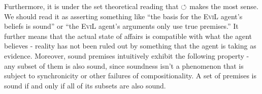 Furthermore, it is under the set theoretical reading that $\circlearrowleft$ makes
the most sense.  We should read it as asserting something like ``the basis for
the \textsc{EviL} agent's beliefs is sound'' or ``the \textsc{EviL}
agent's arguments only use true premises.''  It further means that the
actual state of affairs is compatible with what the agent believes -
reality has not been ruled out by something that the agent is taking
as evidence.  Moreover, sound premises intuitively exhibit the
following property - any subset of them is also sound, since soundness
isn't a phenomenon that is subject to synchronicity or other failures
of compositionality.  A set of premises is sound if and only if all of
its subsets are also sound.

